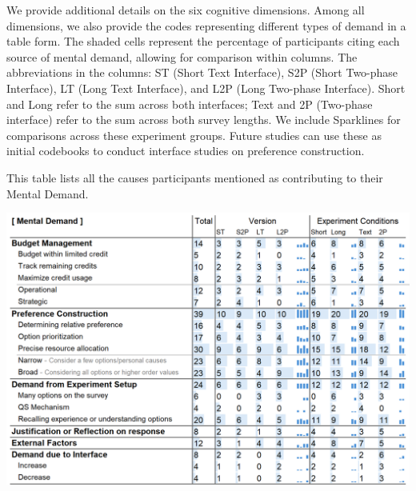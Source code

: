 We provide additional details on the six cognitive dimensions. Among all dimensions, we also provide the codes representing different types of demand in a table form. The shaded cells represent the percentage of participants citing each source of mental demand, allowing for comparison within columns. The abbreviations in the columns: ST (Short Text Interface), S2P (Short Two-phase Interface), LT (Long Text Interface), and L2P (Long Two-phase Interface). Short and Long refer to the sum across both interfaces; Text and 2P (Two-phase interface) refer to the sum across both survey lengths. We include Sparklines for comparisons across these experiment groups. Future studies can use these as initial codebooks to conduct interface studies on preference construction.

\begin{table}[p]
   \caption{This table lists all the causes participants mentioned as contributing to their Mental Demand.}
    \label{tbl:mental}
    \includegraphics[width=0.85\linewidth]{content/image/cog/mental_table.png}
\end{table}

